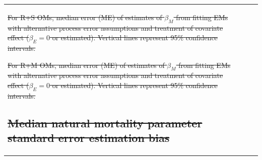 \documentclass[
  12pt,
]{article}
\makeatletter
\providecommand{\DIFdel}[1]{{\protect\color{red}\sout{#1}}} %
\providecommand{\DIFdelFL}[1]{\DIFdel{#1}} %
\let\sout@orig\sout %
\renewcommand{\sout}[1]{\ifmmode\text{\sout@orig{\ensuremath{#1}}}\else\sout@orig{#1}\fi} %
\makeatother
\begin{document}
\begin{table}
{\begin{center}
\begin{tabular}{lrrr}
{%
\DIFdelFL{For R+S OMs, median error (ME) of estimates of $\beta_M$ from fitting EMs with alternative process error assumptions and treatment of covariate effect ($\beta_E = 0$ or estimated). Vertical lines represent 95\% confidence intervals.}}%

{%
\DIFdelFL{For R+M OMs, median error (ME) of estimates of $\beta_M$ from fitting EMs with alternative process error assumptions and treatment of covariate effect ($\beta_E = 0$ or estimated). Vertical lines represent 95\% confidence intervals.}}%

\subsection*{\DIFdel{Median natural mortality parameter standard error estimation bias}}%
\addcontentsline{toc}{subsection}{\DIFdel{Median natural mortality parameter standard error estimation bias}}


\end{tabular}
\end{center}}
\end{table}
\end{document}
